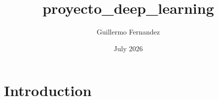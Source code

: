\documentclass{article}
\title{proyecto_deep_learning}
\author{Guillermo Fernandez}
\date{July 2026}
\begin{document}
\maketitle

\section{Introduction}
\end{document}
